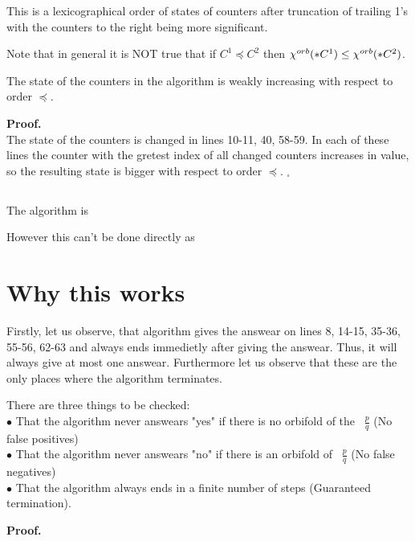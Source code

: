 This is a lexicographical order 
of states of counters after truncation of trailing 1's 
with the counters to the right being more significant. 

Note that in general it is NOT true that if $C^1 \preceq C^2$ then 
${\chi^{orb}(*C^1)} \leq {\chi^{orb}(*C^2)}$.

\begin{lemma}
The state of the counters in the algorithm is weakly increasing with respect to order $\preceq$. 
\end{lemma}
\textbf{Proof.} \\
The state of the counters is changed in lines 10-11, 40, 58-59. In each of these lines 
the counter with the gretest index of all changed counters increases in value, so 
the resulting state is bigger with respect to order $\preceq$. $_\square$

\subsection{}
The algorithm is 

However this can't be done directly as 
 
\section{Why this works}
Firstly, let us observe, that algorithm gives the answear on lines 8, 14-15, 35-36, 55-56, 
62-63 and 
always ends immedietly after giving the answear. Thus, it will always give at most one answear.
Furthermore let us observe that these are the only places where the algorithm terminates.
 
There are three things to be checked: \\
$\bullet$ That the algorithm never answears "yes" if there is no orbifold of the \Eoc\ 
$\frac{p}{q}$ (No false positives)\\
$\bullet$ That the algorithm never answears "no" if there is an orbifold of \Eoc\ 
$\frac{p}{q}$ (No false negatives)\\ 
$\bullet$ That the algorithm always ends in a finite number of steps (Guaranteed termination). 




\begin{lemma}

\end{lemma}
\textbf{Proof.} \\

